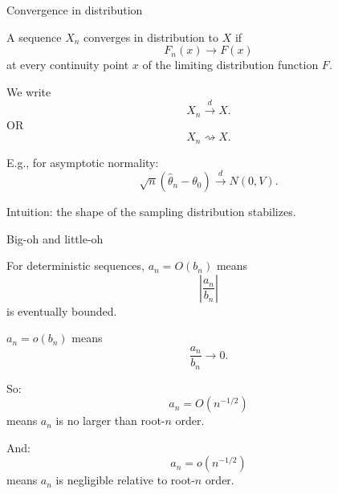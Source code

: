 \documentclass[xcolor={table}, handout]{beamer}
\begin{document}
\note{
\scriptsize \singlespacing

}
\begin{frame}{Convergence in distribution}

\begin{wideitemize}
\item A sequence $X_n$ converges in distribution to $X$ if
\[
F_n(x)\rightarrow F(x)
\]
at every continuity point $x$ of the limiting distribution function $F$.\pause
\item We write
\[
X_n \overset{d}{\rightarrow} X.
\]OR 
\[
X_n \rightsquigarrow X.
\]
\pause
\item E.g., for asymptotic normality:
\[
\sqrt{n}(\hat\theta_n-\theta_0)
  \overset{d}{\rightarrow}
  N(0,V).
\]\pause
\item Intuition: the shape of the sampling distribution stabilizes.
\end{wideitemize}

\end{frame}

\note{
\scriptsize \singlespacing

}
\begin{frame}{Big-oh and little-oh}

\begin{wideitemize}
\item For deterministic sequences, $a_n=O(b_n)$ means
\[
\left|\frac{a_n}{b_n}\right|
\]
is eventually bounded.\pause
\item $a_n=o(b_n)$ means
\[
\frac{a_n}{b_n}\rightarrow 0.
\]\pause
\item So:
\[
a_n=O(n^{-1/2})
\]
means $a_n$ is no larger than root-$n$ order.\pause
\item And:
\[
a_n=o(n^{-1/2})
\]
means $a_n$ is negligible relative to root-$n$ order.
\end{wideitemize}

\end{frame}
\end{document}
